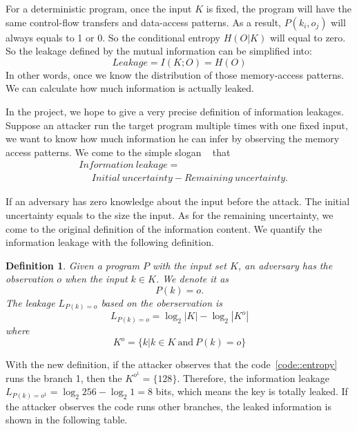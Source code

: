 For a deterministic program, once the input $K$ is fixed, the program will have the same
control-flow transfers and data-access patterns. As a result, $P(k_i, o_j)$ will always
equals to 1 or 0. So the conditional entropy $H(O|K)$ will equal to zero. So the leakage defined
by the mutual information can be simplified into:
\begin{displaymath}
\label{mutual:information}
    \mathit{Leakage} = I(K;O) = H(O)
\end{displaymath}
In other words, once we know the distribution of those memory-access patterns. We can 
calculate how much information is actually leaked.

In the project, we hope to give a very precise definition of information leakages. 
Suppose an attacker run the target program multiple times with one fixed input, we
want to know how much information he can infer by observing the memory access patterns.
We come to the simple slogan ~\cite{10.1007/978-3-642-00596-1_21} %
that
\begin{align*}
 & \mathit{Information\ leakage} = \\
 & ~~~~~~ \mathit{Initial}\ \mathit{uncertainty} - \mathit{Remaining\ uncertainty}. 
\end{align*}


If an adversary has zero knowledge about the input before the attack. The initial uncertainty
equals to the size the input. As for the remaining uncertainty, we come to the original definition
of the information content.
We quantify the information leakage with the following definition. 

\newtheorem{mydef}{Definition}

\begin{mydef}
\label{def}
Given a program $P$ with the input set $K$, 
an adversary has the observation $o$ when the input $k{\in}K$. 
We denote it as
    $$P(k) = o.$$
The leakage $L_{P(k)=o}$ based on the oberservation is
    $$L_{P(k)=o} = \log_2{|K|} - \log_2{|K^o|}$$
    where
    $$K^o = \{k | k \in K \ \text{and} \ P(k) = o \}$$
\end{mydef}

With the new definition, if the attacker observes that the code~\ref{code::entropy} runs the branch 1, 
then the $K^{o^{1}} = \{128\}$. Therefore, the information leakage $L_{P(k)=o^{1}} = \log_2{256} - \log_2{1} = 8$
bits, which means the key is totally leaked. If the attacker observes the code runs other
branches, the leaked information is shown in the following table.

